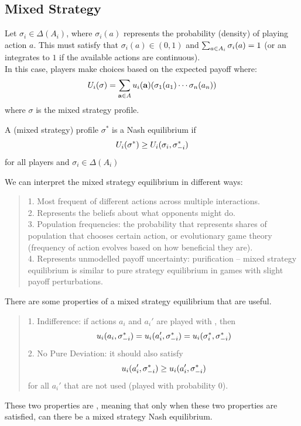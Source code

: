 \subsection{Mixed Strategy}
Let $\sigma_i \in \Delta(A_i)$, where $\sigma_i(a)$ represents the probability (density) of playing action $a$. This must satisfy that $\sigma_i(a) \in (0, 1)$ and $\sum_{a \in A_i} \sigma_i(a) = 1$ (or an integrates to $1$ if the available actions are continuous). \\
In this case, players make choices based on the expected payoff where:
$$U_i(\sigma) = \sum_{\mathbf{a} \in A} u_i(\mathbf{a})(\sigma_1(a_1)\cdots\sigma_n(a_n))$$
where $\sigma$ is the mixed strategy profile.
\begin{definition}
    A (mixed strategy) profile $\sigma^*$ is a Nash equilibrium if
    $$U_i(\sigma^*) \ge U_i(\sigma_i, \sigma_{-i}^*)$$
    for all players and $\sigma_i \in \Delta(A_i)$
\end{definition}
We can interpret the mixed strategy equilibrium in different ways:
\begin{quote}
    1. Most frequent of different actions across multiple interactions. \\
    2. Represents the beliefs about what opponents might do. \\
    3. Population frequencies: the probability that represents shares of population that chooses certain action, or evolutionary game theory (frequency of action evolves based on how beneficial they are). \\
    4. Represents unmodelled payoff uncertainty: purification -- mixed strategy equilibrium is similar to pure strategy equilibrium in games with slight payoff perturbations.
\end{quote}
There are some properties of a mixed strategy equilibrium that are useful.
\begin{quote}
    1. Indifference: if actions $a_i$ and $a_i'$ are played with , then
    $$u_i(a_i, \sigma_{-i}^*) = u_i(a_i', \sigma_{-i}^*) = u_i(\sigma_i^*, \sigma_{-i}^*)$$
    2. No Pure Deviation: it should also satisfy
    $$u_i(a_i', \sigma_{-i}^*) \ge u_i(a_i', \sigma_{-i}^*)$$
    for all $a_i'$ that are not used (played with probability $0$).
\end{quote}
These two properties are , meaning that only when these two properties are satisfied, can there be a mixed strategy Nash equilibrium.

